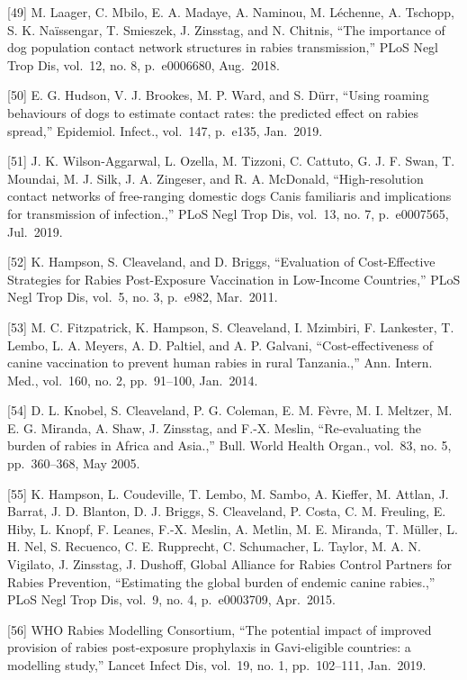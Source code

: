 \documentclass[
  oneside]{book}
\begin{document}
{[}49{]} M. Laager, C. Mbilo, E. A. Madaye, A. Naminou, M. Léchenne, A. Tschopp, S. K. Naïssengar, T. Smieszek, J. Zinsstag, and N. Chitnis, ``The importance of dog population contact network structures in rabies transmission,'' PLoS Negl Trop Dis, vol.~12, no. 8, p.~e0006680, Aug.~2018.

{[}50{]} E. G. Hudson, V. J. Brookes, M. P. Ward, and S. Dürr, ``Using roaming behaviours of dogs to estimate contact rates: the predicted effect on rabies spread,'' Epidemiol. Infect., vol.~147, p.~e135, Jan.~2019.

{[}51{]} J. K. Wilson-Aggarwal, L. Ozella, M. Tizzoni, C. Cattuto, G. J. F. Swan, T. Moundai, M. J. Silk, J. A. Zingeser, and R. A. McDonald, ``High-resolution contact networks of free-ranging domestic dogs Canis familiaris and implications for transmission of infection.,'' PLoS Negl Trop Dis, vol.~13, no. 7, p.~e0007565, Jul.~2019.

{[}52{]} K. Hampson, S. Cleaveland, and D. Briggs, ``Evaluation of Cost-Effective Strategies for Rabies Post-Exposure Vaccination in Low-Income Countries,'' PLoS Negl Trop Dis, vol.~5, no. 3, p.~e982, Mar.~2011.

{[}53{]} M. C. Fitzpatrick, K. Hampson, S. Cleaveland, I. Mzimbiri, F. Lankester, T. Lembo, L. A. Meyers, A. D. Paltiel, and A. P. Galvani, ``Cost-effectiveness of canine vaccination to prevent human rabies in rural Tanzania.,'' Ann. Intern. Med., vol.~160, no. 2, pp.~91--100, Jan.~2014.

{[}54{]} D. L. Knobel, S. Cleaveland, P. G. Coleman, E. M. Fèvre, M. I. Meltzer, M. E. G. Miranda, A. Shaw, J. Zinsstag, and F.-X. Meslin, ``Re-evaluating the burden of rabies in Africa and Asia.,'' Bull. World Health Organ., vol.~83, no. 5, pp.~360--368, May 2005.

{[}55{]} K. Hampson, L. Coudeville, T. Lembo, M. Sambo, A. Kieffer, M. Attlan, J. Barrat, J. D. Blanton, D. J. Briggs, S. Cleaveland, P. Costa, C. M. Freuling, E. Hiby, L. Knopf, F. Leanes, F.-X. Meslin, A. Metlin, M. E. Miranda, T. Müller, L. H. Nel, S. Recuenco, C. E. Rupprecht, C. Schumacher, L. Taylor, M. A. N. Vigilato, J. Zinsstag, J. Dushoff, Global Alliance for Rabies Control Partners for Rabies Prevention, ``Estimating the global burden of endemic canine rabies.,'' PLoS Negl Trop Dis, vol.~9, no. 4, p.~e0003709, Apr.~2015.

{[}56{]} WHO Rabies Modelling Consortium, ``The potential impact of improved provision of rabies post-exposure prophylaxis in Gavi-eligible countries: a modelling study,'' Lancet Infect Dis, vol.~19, no. 1, pp.~102--111, Jan.~2019.
\end{document}
